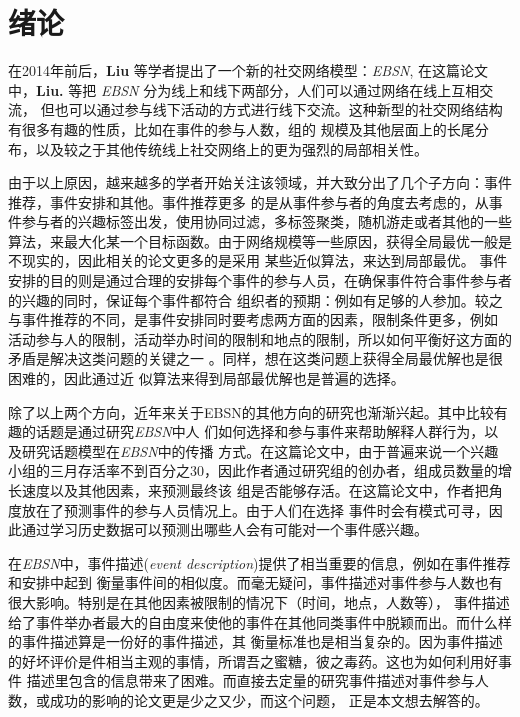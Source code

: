 \documentclass[12pt]{template}
\begin{document}
\section{绪论} 
\par{
    在2014年前后，\textbf{Liu} 等学者提出了一个新的社交网络模型：\textit{EBSN}\cite{EBSN_linking},
在这篇论文中，\textbf{Liu.} 等把 \textit{EBSN} 分为线上和线下两部分，人们可以通过网络在线上互相交流，
但也可以通过参与线下活动的方式进行线下交流。这种新型的社交网络结构有很多有趣的性质，比如在事件的参与人数，组的
规模及其他层面上的长尾分布，以及较之于其他传统线上社交网络上的更为强烈的局部相关性。
}

\par{
    由于以上原因，越来越多的学者开始关注该领域，并大致分出了几个子方向：事件推荐，事件安排和其他。事件推荐更多
    的是从事件参与者的角度去考虑的，从事件参与者的兴趣标签出发，使用协同过滤，多标签聚类，随机游走或者其他的一些
    算法，来最大化某一个目标函数。由于网络规模等一些原因，获得全局最优一般是不现实的，因此相关的论文更多的是采用
    某些近似算法，来达到局部最优\cite{EBSN_event_reco}\cite{EBSN_on_social}\cite{EBSN_event_recom2}。
    事件安排的目的则是通过合理的安排每个事件的参与人员，在确保事件符合事件参与者的兴趣的同时，保证每个事件都符合
    组织者的预期：例如有足够的人参加。较之与事件推荐的不同，是事件安排同时要考虑两方面的因素，限制条件更多，例如
    活动参与人的限制，活动举办时间的限制和地点的限制，所以如何平衡好这方面的矛盾是解决这类问题的关键之一\cite{EBSN_conflict-aware_2016}
    \cite{EBSN_feedback-aware_2017}\cite{EBSN_conflict-aware_2015}。同样，想在这类问题上获得全局最优解也是很困难的，因此通过近
    似算法来得到局部最优解也是普遍的选择。
}
\par{
    除了以上两个方向，近年来关于EBSN的其他方向的研究也渐渐兴起。其中比较有趣的话题是通过研究\textit{EBSN}中人
    们如何选择和参与事件来帮助解释人群行为\cite{EBSN_understanding}，以及研究话题模型在\textit{EBSN}中的传播
    方式。在\cite{EBSN_can_i}这篇论文中，由于普遍来说一个兴趣小组的三月存活率不到百分之30，因此作者通过研究组的创办者，组成员数量的增长速度以及其他因素，来预测最终该
    组是否能够存活。在\cite{EBSN_who_will}这篇论文中，作者把角度放在了预测事件的参与人员情况上。由于人们在选择
    事件时会有模式可寻，因此通过学习历史数据可以预测出哪些人会有可能对一个事件感兴趣。
}
\par{
    在\textit{EBSN}中，事件描述(\textit{event description})提供了相当重要的信息，例如在事件推荐和安排中起到
    衡量事件间的相似度。而毫无疑问，事件描述对事件参与人数也有很大影响。特别是在其他因素被限制的情况下（时间，地点，人数等），
    事件描述给了事件举办者最大的自由度来使他的事件在其他同类事件中脱颖而出。而什么样的事件描述算是一份好的事件描述，其
    衡量标准也是相当复杂的。因为事件描述的好坏评价是件相当主观的事情，所谓吾之蜜糖，彼之毒药。这也为如何利用好事件
    描述里包含的信息带来了困难。而直接去定量的研究事件描述对事件参与人数，或成功的影响的论文更是少之又少，而这个问题，
    正是本文想去解答的。
}
\end{document}
